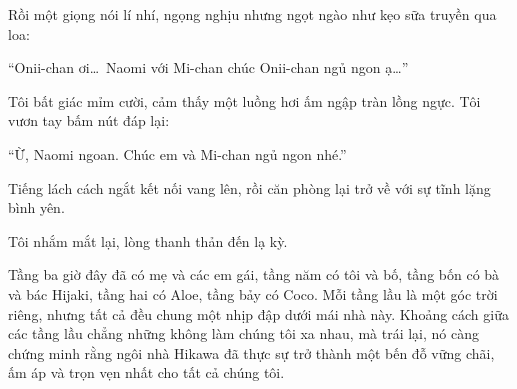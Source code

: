 ﻿\documentclass[../main.tex]{subfiles}
\begin{document}
Rồi một giọng nói lí nhí, ngọng nghịu nhưng ngọt ngào như kẹo sữa truyền qua loa:

``Onii-chan ơi\dots\ Naomi với Mi-chan chúc Onii-chan ngủ ngon ạ\dots''

Tôi bất giác mỉm cười, cảm thấy một luồng hơi ấm ngập tràn lồng ngực. Tôi vươn tay bấm nút đáp lại:

``Ừ, Naomi ngoan. Chúc em và Mi-chan ngủ ngon nhé.''

Tiếng lách cách ngắt kết nối vang lên, rồi căn phòng lại trở về với sự tĩnh lặng bình yên.

Tôi nhắm mắt lại, lòng thanh thản đến lạ kỳ.

Tầng ba giờ đây đã có mẹ và các em gái, tầng năm có tôi và bố, tầng bốn có bà và bác Hijaki, tầng hai có Aloe, tầng bảy có Coco. Mỗi tầng lầu là một góc trời riêng, nhưng tất cả đều chung một nhịp đập dưới mái nhà này. Khoảng cách giữa các tầng lầu chẳng những không làm chúng tôi xa nhau, mà trái lại, nó càng chứng minh rằng ngôi nhà Hikawa đã thực sự trở thành một bến đỗ vững chãi, ấm áp và trọn vẹn nhất cho tất cả chúng tôi.
\end{document}
